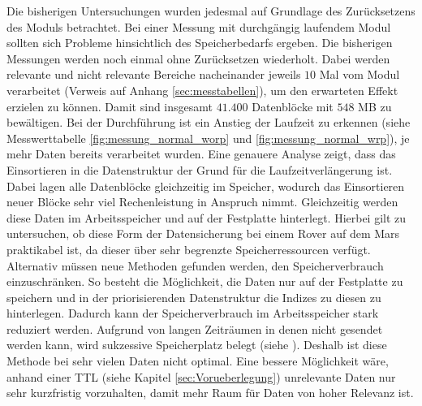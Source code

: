 Die bisherigen Untersuchungen wurden jedesmal auf Grundlage des Zurücksetzens
des Moduls betrachtet. Bei einer Messung mit durchgängig laufendem Modul sollten
sich Probleme hinsichtlich des Speicherbedarfs ergeben.
\newline
Die bisherigen Messungen werden noch einmal ohne Zurücksetzen wiederholt. Dabei
werden relevante und nicht relevante Bereiche nacheinander jeweils $10$ Mal vom
Modul verarbeitet (Verweis auf Anhang \ref{sec:messtabellen}), um den
erwarteten Effekt erzielen zu können. Damit sind insgesamt $41.400$ Datenblöcke
mit $548$ MB zu bewältigen.
\newline
Bei der Durchführung ist ein Anstieg der Laufzeit zu erkennen (siehe
Messwerttabelle \ref{fig:messung_normal_worp} und \ref{fig:messung_normal_wrp}),
je mehr Daten bereits verarbeitet wurden. Eine genauere Analyse zeigt, dass das
Einsortieren in die Datenstruktur  der Grund für die
Laufzeitverlängerung ist.
Dabei lagen alle Datenblöcke gleichzeitig im Speicher, wodurch das
Einsortieren neuer Blöcke sehr viel Rechenleistung in Anspruch nimmt.
Gleichzeitig werden diese Daten im Arbeitsspeicher und auf der Festplatte
hinterlegt. Hierbei gilt zu untersuchen, ob diese Form der Datensicherung bei
einem Rover auf dem Mars praktikabel ist, da dieser über sehr begrenzte
Speicherressourcen verfügt. \newline
Alternativ müssen neue Methoden gefunden werden, den
Speicherverbrauch einzuschränken. So besteht die Möglichkeit, die Daten nur auf
der Festplatte zu speichern und in der priorisierenden Datenstruktur die Indizes
zu diesen zu hinterlegen. Dadurch kann der Speicherverbrauch im Arbeitsspeicher
stark reduziert werden. Aufgrund von langen Zeiträumen in denen nicht gesendet
werden kann, wird sukzessive Speicherplatz belegt (siehe ).
Deshalb ist diese Methode bei sehr vielen Daten nicht optimal. Eine bessere
Möglichkeit wäre, anhand einer \gls{TTL} (siehe Kapitel
\ref{sec:Vorueberlegung}) unrelevante Daten nur sehr kurzfristig vorzuhalten,
damit mehr Raum für Daten von hoher Relevanz ist.
